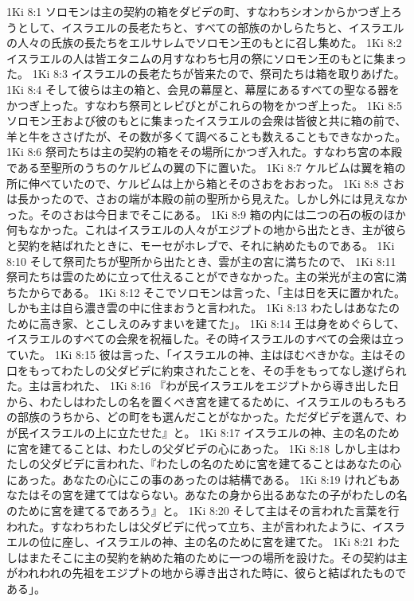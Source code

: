 1Ki 8:1  ソロモンは主の契約の箱をダビデの町、すなわちシオンからかつぎ上ろうとして、イスラエルの長老たちと、すべての部族のかしらたちと、イスラエルの人々の氏族の長たちをエルサレムでソロモン王のもとに召し集めた。
1Ki 8:2  イスラエルの人は皆エタニムの月すなわち七月の祭にソロモン王のもとに集まった。
1Ki 8:3  イスラエルの長老たちが皆来たので、祭司たちは箱を取りあげた。
1Ki 8:4  そして彼らは主の箱と、会見の幕屋と、幕屋にあるすべての聖なる器をかつぎ上った。すなわち祭司とレビびとがこれらの物をかつぎ上った。
1Ki 8:5  ソロモン王および彼のもとに集まったイスラエルの会衆は皆彼と共に箱の前で、羊と牛をささげたが、その数が多くて調べることも数えることもできなかった。
1Ki 8:6  祭司たちは主の契約の箱をその場所にかつぎ入れた。すなわち宮の本殿である至聖所のうちのケルビムの翼の下に置いた。
1Ki 8:7  ケルビムは翼を箱の所に伸べていたので、ケルビムは上から箱とそのさおをおおった。
1Ki 8:8  さおは長かったので、さおの端が本殿の前の聖所から見えた。しかし外には見えなかった。そのさおは今日までそこにある。
1Ki 8:9  箱の内には二つの石の板のほか何もなかった。これはイスラエルの人々がエジプトの地から出たとき、主が彼らと契約を結ばれたときに、モーセがホレブで、それに納めたものである。
1Ki 8:10  そして祭司たちが聖所から出たとき、雲が主の宮に満ちたので、
1Ki 8:11  祭司たちは雲のために立って仕えることができなかった。主の栄光が主の宮に満ちたからである。
1Ki 8:12  そこでソロモンは言った、「主は日を天に置かれた。しかも主は自ら濃き雲の中に住まおうと言われた。
1Ki 8:13  わたしはあなたのために高き家、とこしえのみすまいを建てた」。
1Ki 8:14  王は身をめぐらして、イスラエルのすべての会衆を祝福した。その時イスラエルのすべての会衆は立っていた。
1Ki 8:15  彼は言った、「イスラエルの神、主はほむべきかな。主はその口をもってわたしの父ダビデに約束されたことを、その手をもってなし遂げられた。主は言われた、
1Ki 8:16  『わが民イスラエルをエジプトから導き出した日から、わたしはわたしの名を置くべき宮を建てるために、イスラエルのもろもろの部族のうちから、どの町をも選んだことがなかった。ただダビデを選んで、わが民イスラエルの上に立たせた』と。
1Ki 8:17  イスラエルの神、主の名のために宮を建てることは、わたしの父ダビデの心にあった。
1Ki 8:18  しかし主はわたしの父ダビデに言われた、『わたしの名のために宮を建てることはあなたの心にあった。あなたの心にこの事のあったのは結構である。
1Ki 8:19  けれどもあなたはその宮を建ててはならない。あなたの身から出るあなたの子がわたしの名のために宮を建てるであろう』と。
1Ki 8:20  そして主はその言われた言葉を行われた。すなわちわたしは父ダビデに代って立ち、主が言われたように、イスラエルの位に座し、イスラエルの神、主の名のために宮を建てた。
1Ki 8:21  わたしはまたそこに主の契約を納めた箱のために一つの場所を設けた。その契約は主がわれわれの先祖をエジプトの地から導き出された時に、彼らと結ばれたものである」。
